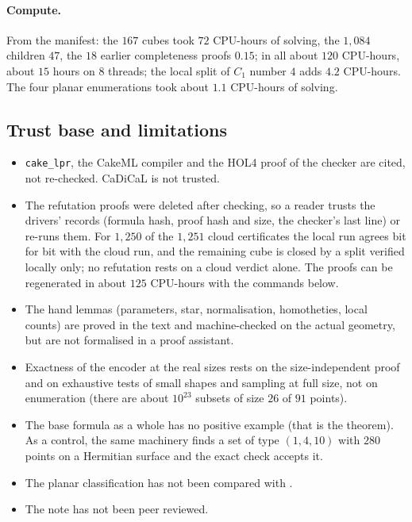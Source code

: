 \documentclass[11pt]{article}
\theoremstyle{plain}
\theoremstyle{remark}
\begin{document}
\paragraph{Compute.}
From the manifest: the $167$ cubes took $72$ CPU-hours of solving, the $1{,}084$ children $47$, the $18$ earlier completeness proofs $0.15$; in all about $120$ CPU-hours, about $15$ hours on $8$ threads; the local split of $C_1$ number $4$ adds $4.2$ CPU-hours.
The four planar enumerations took about $1.1$ CPU-hours of solving.

\subsection{Trust base and limitations}\label{sec:trust}
\begin{itemize}
\item \texttt{cake\_lpr}, the CakeML compiler and the HOL4 proof of the checker are cited, not re-checked. CaDiCaL is not trusted.
\item The refutation proofs were deleted after checking, so a reader trusts the drivers' records (formula hash, proof hash and size, the checker's last line) or re-runs them. For $1{,}250$ of the $1{,}251$ cloud certificates the local run agrees bit for bit with the cloud run, and the remaining cube is closed by a split verified locally only; no refutation rests on a cloud verdict alone. The proofs can be regenerated in about $125$ CPU-hours with the commands below.
\item The hand lemmas (parameters, star, normalisation, homotheties, local counts) are proved in the text and machine-checked on the actual geometry, but are not formalised in a proof assistant.
\item Exactness of the encoder at the real sizes rests on the size-independent proof and on exhaustive tests of small shapes and sampling at full size, not on enumeration (there are about $10^{23}$ subsets of size $26$ of $91$ points).
\item The base formula as a whole has no positive example (that is the theorem). As a control, the same machinery finds a set of type $(1,4,10)$ with $280$ points on a Hermitian surface and the exact check accepts it.
\item The planar classification has not been compared with \cite{PR}.
\item The note has not been peer reviewed.
\end{itemize}
\end{document}
